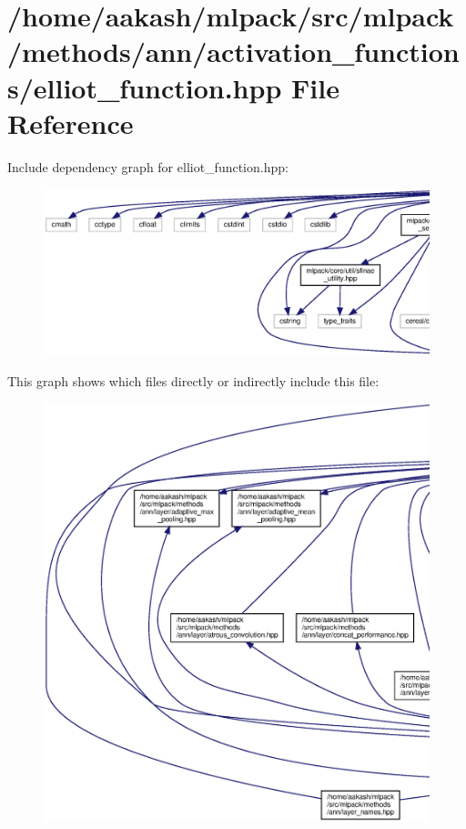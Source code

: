 \section{/home/aakash/mlpack/src/mlpack/methods/ann/activation\+\_\+functions/elliot\+\_\+function.hpp File Reference}
\label{elliot__function_8hpp}
Include dependency graph for elliot\+\_\+function.\+hpp\+:
\nopagebreak
\begin{figure}[H]
\begin{center}
\leavevmode
\includegraphics[width=350pt]{elliot__function_8hpp__incl}
\end{center}
\end{figure}
This graph shows which files directly or indirectly include this file\+:
\nopagebreak
\begin{figure}[H]
\begin{center}
\leavevmode
\includegraphics[width=350pt]{elliot__function_8hpp__dep__incl}
\end{center}
\end{figure}
